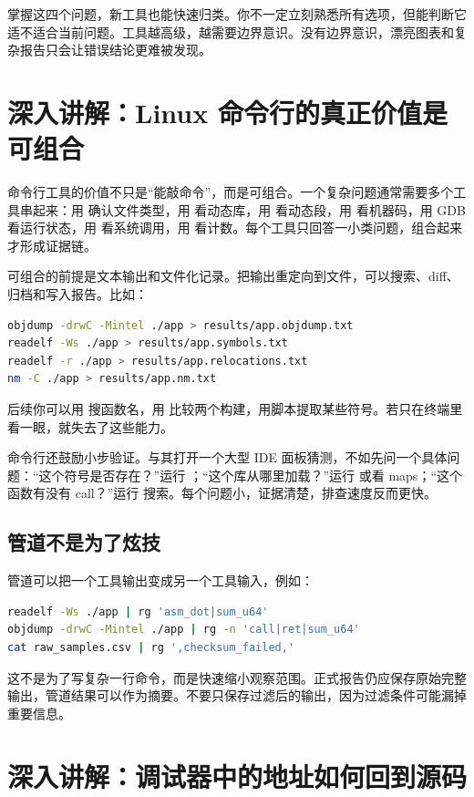 掌握这四个问题，新工具也能快速归类。你不一定立刻熟悉所有选项，但能判断它适不适合当前问题。工具越高级，越需要边界意识。没有边界意识，漂亮图表和复杂报告只会让错误结论更难被发现。

\section{深入讲解：Linux 命令行的真正价值是可组合}

命令行工具的价值不只是“能敲命令”，而是可组合。一个复杂问题通常需要多个工具串起来：用  确认文件类型，用  看动态库，用  看动态段，用  看机器码，用 GDB 看运行状态，用  看系统调用，用  看计数。每个工具只回答一小类问题，组合起来才形成证据链。

可组合的前提是文本输出和文件化记录。把输出重定向到文件，可以搜索、diff、归档和写入报告。比如：

\begin{lstlisting}[language=bash]
objdump -drwC -Mintel ./app > results/app.objdump.txt
readelf -Ws ./app > results/app.symbols.txt
readelf -r ./app > results/app.relocations.txt
nm -C ./app > results/app.nm.txt
\end{lstlisting}

后续你可以用  搜函数名，用  比较两个构建，用脚本提取某些符号。若只在终端里看一眼，就失去了这些能力。

命令行还鼓励小步验证。与其打开一个大型 IDE 面板猜测，不如先问一个具体问题：“这个符号是否存在？”运行 ；“这个库从哪里加载？”运行  或看 maps；“这个函数有没有 call？”运行  搜索。每个问题小，证据清楚，排查速度反而更快。

\subsection{管道不是为了炫技}

管道可以把一个工具输出变成另一个工具输入，例如：

\begin{lstlisting}[language=bash]
readelf -Ws ./app | rg 'asm_dot|sum_u64'
objdump -drwC -Mintel ./app | rg -n 'call|ret|sum_u64'
cat raw_samples.csv | rg ',checksum_failed,'
\end{lstlisting}

这不是为了写复杂一行命令，而是快速缩小观察范围。正式报告仍应保存原始完整输出，管道结果可以作为摘要。不要只保存过滤后的输出，因为过滤条件可能漏掉重要信息。

\section{深入讲解：调试器中的地址如何回到源码}


